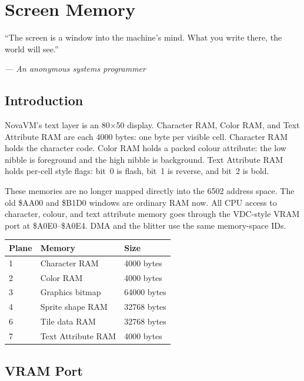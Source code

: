 \chapter{Screen Memory}

\epigraph{``The screen is a window into the machine's mind. What you write
there, the world will see.''}{\textit{--- An anonymous systems programmer}}

\section*{Introduction}

NovaVM's text layer is an 80$\times$50 display. Character RAM, Color RAM,
and Text Attribute RAM are each 4000 bytes: one byte per visible cell.
Character RAM holds the character code. Color RAM holds a packed colour
attribute: the low nibble is foreground and the high nibble is background.
Text Attribute RAM holds per-cell style flags: bit~0 is flash, bit~1 is
reverse, and bit~2 is bold.

These memories are no longer mapped directly into the 6502 address space.
The old \$AA00 and \$B1D0 windows are ordinary RAM now. All CPU access to
character, colour, and text attribute memory goes through the VDC-style VRAM port at
\$A0E0--\$A0E4. DMA and the blitter use the same memory-space IDs.

\begin{center}
\small
\begin{tabular}{@{}lll@{}}
\toprule
\textbf{Plane} & \textbf{Memory} & \textbf{Size} \\
\midrule
1 & Character RAM & 4000 bytes \\
2 & Color RAM & 4000 bytes \\
3 & Graphics bitmap & 64000 bytes \\
4 & Sprite shape RAM & 32768 bytes \\
6 & Tile data RAM & 32768 bytes \\
7 & Text Attribute RAM & 4000 bytes \\
\bottomrule
\end{tabular}
\end{center}

\section{VRAM Port}
\label{sec:charram}


